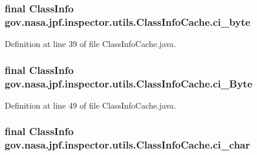 \subsubsection[{\texorpdfstring{ci\+\_\+byte}{ci_byte}}]{\setlength{\rightskip}{0pt plus 5cm}final Class\+Info gov.\+nasa.\+jpf.\+inspector.\+utils.\+Class\+Info\+Cache.\+ci\+\_\+byte}\hypertarget{classgov_1_1nasa_1_1jpf_1_1inspector_1_1utils_1_1_class_info_cache_aac9f1bc10f1cb8408516f622c3bdbf06}{}\label{classgov_1_1nasa_1_1jpf_1_1inspector_1_1utils_1_1_class_info_cache_aac9f1bc10f1cb8408516f622c3bdbf06}


Definition at line 39 of file Class\+Info\+Cache.\+java.

\subsubsection[{\texorpdfstring{ci\+\_\+\+Byte}{ci_Byte}}]{\setlength{\rightskip}{0pt plus 5cm}final Class\+Info gov.\+nasa.\+jpf.\+inspector.\+utils.\+Class\+Info\+Cache.\+ci\+\_\+\+Byte}\hypertarget{classgov_1_1nasa_1_1jpf_1_1inspector_1_1utils_1_1_class_info_cache_a9f20df4baa3d028de1256ef61e82d7dc}{}\label{classgov_1_1nasa_1_1jpf_1_1inspector_1_1utils_1_1_class_info_cache_a9f20df4baa3d028de1256ef61e82d7dc}


Definition at line 49 of file Class\+Info\+Cache.\+java.

\subsubsection[{\texorpdfstring{ci\+\_\+char}{ci_char}}]{\setlength{\rightskip}{0pt plus 5cm}final Class\+Info gov.\+nasa.\+jpf.\+inspector.\+utils.\+Class\+Info\+Cache.\+ci\+\_\+char}\hypertarget{classgov_1_1nasa_1_1jpf_1_1inspector_1_1utils_1_1_class_info_cache_a7313012fee3ae4a80df6f02bb6baf4df}{}\label{classgov_1_1nasa_1_1jpf_1_1inspector_1_1utils_1_1_class_info_cache_a7313012fee3ae4a80df6f02bb6baf4df}


